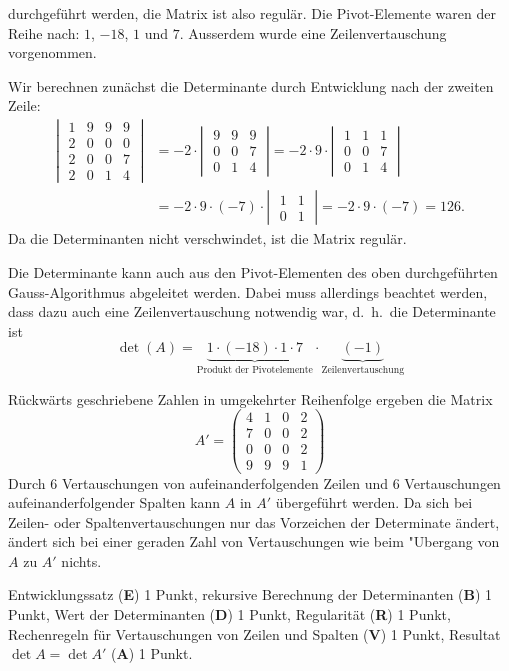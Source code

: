 \begin{loesung}
\begin{teilaufgaben}
durchgeführt werden, die Matrix ist also regulär. Die Pivot-Elemente
waren der Reihe nach: $1$, $-18$, $1$ und $7$.
Ausserdem wurde eine Zeilenvertauschung vorgenommen.
\item
Wir berechnen zunächst die Determinante durch Entwicklung
nach der zweiten Zeile:
\begin{align*}
\left|\;
\begin{matrix}
1&9&9&9\\
2&0&0&0\\
2&0&0&7\\
2&0&1&4
\end{matrix}
\;\right|
&=
-2\cdot
\left|\;\begin{matrix}
9&9&9\\
0&0&7\\
0&1&4
\end{matrix}\;\right|
=-2\cdot 9\cdot
\left|\;\begin{matrix}
1&1&1\\
0&0&7\\
0&1&4
\end{matrix}\;\right|
\\
&=
-2\cdot 9\cdot(-7)\cdot
\left|\;\begin{matrix}
1&1\\
0&1
\end{matrix}\;\right|
=
-2\cdot 9\cdot(-7)=126.
\end{align*}
Da die Determinanten nicht verschwindet, ist die Matrix regulär.

Die Determinante kann auch aus den Pivot-Elementen des oben durchgeführten
Gauss-Algorithmus abgeleitet werden. Dabei muss allerdings beachtet werden,
dass dazu auch eine Zeilenvertauschung notwendig war, d.~h.~die Determinante
ist 
\[
\det(A)=\underbrace{1\cdot (-18)\cdot 1\cdot 7}_{\text{Produkt der Pivotelemente}}\cdot \underbrace{(-1)}_{\text{Zeilenvertauschung}}
\]
\item Rückwärts geschriebene Zahlen in umgekehrter Reihenfolge 
ergeben die Matrix
\[
A'=\begin{pmatrix}
4&1&0&2\\
7&0&0&2\\
0&0&0&2\\
9&9&9&1
\end{pmatrix}
\]
Durch 6 Vertauschungen von aufeinanderfolgenden Zeilen und 6
Vertauschungen aufeinanderfolgender Spalten kann $A$ in $A'$
übergeführt werden. Da sich bei Zeilen- oder Spaltenvertauschungen
nur das Vorzeichen der Determinate ändert, ändert sich bei
einer geraden Zahl von Vertauschungen wie beim "Ubergang von $A$
zu $A'$ nichts.
\qedhere
\end{teilaufgaben}
\end{loesung}

\begin{bewertung}
Entwicklungssatz ({\bf E}) 1 Punkt,
rekursive Berechnung der Determinanten ({\bf B}) 1 Punkt,
Wert der Determinanten ({\bf D}) 1 Punkt,
Regularität ({\bf R}) 1 Punkt, 
Rechenregeln für Vertauschungen von Zeilen und Spalten ({\bf V}) 1 Punkt,
Resultat $\det A=\det A'$ ({\bf A}) 1 Punkt.
\end{bewertung}




